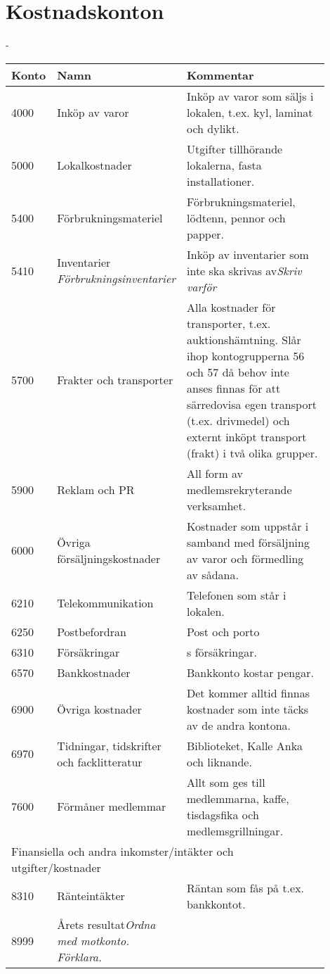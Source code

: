 \section{Kostnadskonton}
\begin{addmargin*}[0em]{-\overhang}
	\begin{longtable}[l]{l p{0.4\linewidth} p{0.5\linewidth}}
		Konto	&	Namn								& Kommentar \\ \toprule \endhead
		4000	&	Inköp av varor						& Inköp av varor som säljs i lokalen, t.ex. kyl, laminat och dylikt.\\
		5000	&	Lokalkostnader						& Utgifter tillhörande lokalerna, fasta installationer.\\
		5400	&	Förbrukningsmateriel				& Förbrukningsmateriel, lödtenn, pennor och papper.\\
		5410	&	Inventarier \newline \emph{Förbrukningsinventarier} & Inköp av inventarier som inte ska skrivas av\emph{Skriv varför}\\
		5700	&	Frakter och transporter				& Alla kostnader för transporter, t.ex. auktionshämtning. Slår ihop kontogrupperna 56 och 57 då behov inte anses finnas för att särredovisa egen transport (t.ex. drivmedel) och externt inköpt transport (frakt) i två olika grupper.\\
		5900	&	Reklam och PR						& All form av medlemsrekryterande verksamhet.\\
		6000	&	Övriga försäljningskostnader		& Kostnader som uppstår i samband med försäljning av varor och förmedling av sådana.\\
		6210	&	Telekommunikation					& Telefonen som står i lokalen.\\
		6250	&	Postbefordran						& Post och porto\\
		6310	&	Försäkringar						& \acr{Eta}s försäkringar.\\
		6570	&	Bankkostnader						& Bankkonto kostar pengar.\\
		6900	&	Övriga kostnader					& Det kommer alltid finnas kostnader som inte täcks av de andra kontona.\\
		6970	&	Tidningar, tidskrifter och facklitteratur & Biblioteket, Kalle Anka och liknande.\\
		7600	&	Förmåner medlemmar					& Allt som ges till medlemmarna, kaffe, tisdagsfika och medlemsgrillningar.\\[1.5\baselineskip]
		\multicolumn{3}{l}{Finansiella och andra inkomster/intäkter och utgifter/kostnader}\\ \midrule
		8310	&	Ränteintäkter						& Räntan som fås på t.ex. bankkontot.\\
		8999	&	Årets resultat\emph{Ordna med motkonto. Förklara.}\\
	\end{longtable}
\end{addmargin*}
